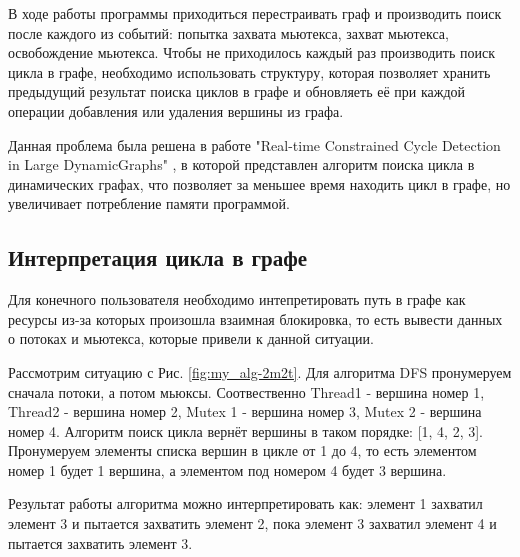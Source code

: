 В ходе работы программы приходиться перестраивать граф и производить поиск после каждого из событий: попытка захвата мьютекса, захват мьютекса, освобождение мьютекса. Чтобы не приходилось каждый раз производить поиск цикла в графе, необходимо использовать структуру, которая позволяет хранить предыдущий результат поиска циклов в графе и обновляеть её при каждой операции добавления или удаления вершины из графа.

Данная проблема была решена в работе "Real-time Constrained Cycle Detection in Large DynamicGraphs" \cite{dynamic_cycle}, в которой представлен алгоритм поиска цикла в динамических графах, что позволяет за меньшее время находить цикл в графе, но увеличивает потребление памяти программой.

\subsection{Интерпретация цикла в графе}

Для конечного пользователя необходимо интепретировать путь в графе как ресурсы из-за которых произошла взаимная блокировка, то есть вывести данных о потоках и мьютекса, которые привели к данной ситуации.

Рассмотрим ситуацию с Рис. \ref{fig:my_alg-2m2t}. Для алгоритма DFS пронумеруем сначала потоки, а потом мьюксы. Соотвественно Thread1 - вершина номер 1, Thread2 - вершина номер 2, Mutex 1 - вершина номер 3,  Mutex 2 - вершина номер 4. Алгоритм поиск цикла вернёт вершины в таком порядке: [1, 4, 2, 3]. Пронумеруем элементы списка вершин в цикле от 1 до 4, то есть элементом номер 1 будет 1 вершина, а элементом под номером 4 будет 3 вершина.

Результат работы алгоритма можно интерпретировать как: элемент 1 захватил элемент 3 и пытается захватить элемент 2, пока элемент 3 захватил элемент 4 и пытается захватить элемент 3.

\clearpage